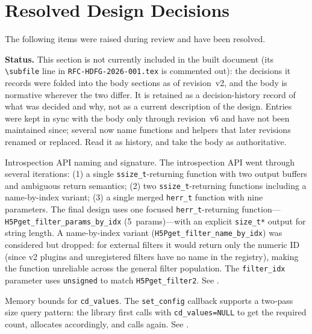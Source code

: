 \documentclass[../RFC-HDFG-2026-001.tex]{subfiles}
\begin{document}
\section{Resolved Design Decisions}
\label{sec:resolved}

The following items were raised during review and have been resolved.

\begin{notebox}
\textbf{Status.} This section is not currently included in the built
document (its \texttt{\textbackslash subfile} line in
\texttt{RFC-HDFG-2026-001.tex} is commented out): the decisions it records
were folded into the body sections as of revision~v2, and the body is
normative wherever the two differ.  It is retained as a decision-history
record of what was decided and why, not as a current description of the
design.  Entries were kept in sync with the body only through revision~v6
and have not been maintained since; several now name functions and helpers
that later revisions renamed or replaced.  Read it as history, and take the
body as authoritative.
\end{notebox}

Introspection API naming and signature. The introspection API went through
several iterations: (1) a single \texttt{ssize\_t}-returning function with two
output buffers and ambiguous return semantics; (2) two \texttt{ssize\_t}-returning
functions including a name-by-index variant; (3) a single merged \texttt{herr\_t}
function with nine parameters. The final design uses one focused
\texttt{herr\_t}-returning function---\texttt{H5Pget\_filter\_params\_by\_idx}
(5~params)---with an explicit \texttt{size\_t*} output for string length.
A name-by-index variant (\texttt{H5Pget\_filter\_name\_by\_idx}) was considered
but dropped: for external filters it would return only the numeric ID (since
v2 plugins and unregistered filters have no name in the registry), making the
function unreliable across the general filter population.
The \texttt{filter\_idx} parameter uses \texttt{unsigned} to match \texttt{H5Pget\_filter2}. See
.

Memory bounds for \texttt{cd\_values}. The \texttt{set\_config} callback supports a
two-pass size query pattern: the library first calls with \texttt{cd\_values=NULL} to
get the required count, allocates accordingly, and calls again. See
.
\end{document}
